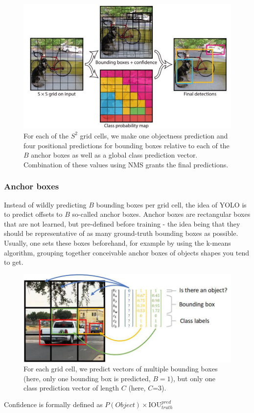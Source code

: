 \documentclass[a4paper]{article}
\begin{document}
\begin{figure}
\label{fig:yolo_model}
\includegraphics[scale=0.35]{images/yolo_model}

\caption{For each of the $S^2$ grid cells, we make one objectness prediction and four positional predictions for bounding boxes relative to each of the $B$ anchor boxes as well as a global class prediction vector. Combination of these values using NMS grants the final predictions.}


\end{figure}


\subsubsection*{Anchor boxes}
Instead of wildly predicting $B$ bounding boxes per grid cell, the idea of YOLO is to predict offsets to $B$ so-called anchor boxes. Anchor boxes are rectangular boxes that are not learned, but pre-defined before training - the idea being that they should be representative of as many ground-truth bounding boxes as possible. \\
Usually, one sets these boxes beforehand, for example by using the k-means algorithm, grouping together conceivable anchor boxes of objects shapes you tend to get. 
\begin{figure}
\includegraphics[scale=0.35]{images/yolo_mechanics}
\caption{For each grid cell, we predict vectors of multiple bounding boxes (here, only one bounding box is predicted, $B=1$), but only one class prediction vector of length $C$ (here, $C$=3).}
\label{fig:cell}
\end{figure}
Confidence is formally defined as $P(Object) \times \text{IOU}^{pred}_{truth}$
\end{document}
